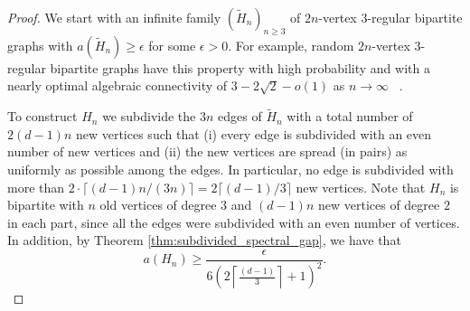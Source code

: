 \documentclass[a4paper,11pt]{article}
\theoremstyle{plain}
\theoremstyle{definition}
\begin{document}
\begin{proof}
We start with an infinite family $(\tilde{H}_n)_{n\ge 3}$ of $2n$-vertex $3$-regular bipartite graphs with $a(\tilde H_n)  \geq \epsilon$ for some $\epsilon>0$. For example, random $2n$-vertex $3$-regular bipartite graphs  have this property with high probability and with a nearly optimal algebraic connectivity of $3-2\sqrt{2}-o(1)$ as $n\to\infty$ ~\cite{brito2022spectral}.

To construct $H_n$ we subdivide the $3n$ edges of $\tilde H_n$ with a total number of $2(d-1)n$ new vertices such that (i) every edge is subdivided with an even number of new vertices and (ii) the new vertices are spread (in pairs) as uniformly as possible among the edges. In particular, no edge is subdivided with more than $2\cdot \lceil (d-1)n /(3n)\rceil=2\lceil (d-1)/3 \rceil$ new vertices. Note that $H_n$ is bipartite with $n$ old vertices of degree $3$ and $(d-1)n$ new vertices of degree $2$ in each part, since all the edges were subdivided with an even number of vertices. In addition, by Theorem \ref{thm:subdivided_spectral_gap}, we have that 
\[
a(H_n) \ge  \frac{\epsilon}{6\left(2 \left\lceil\frac{(d-1)}{3}\right\rceil+1\right)^2}.
\]
\end{proof}
\end{document}
